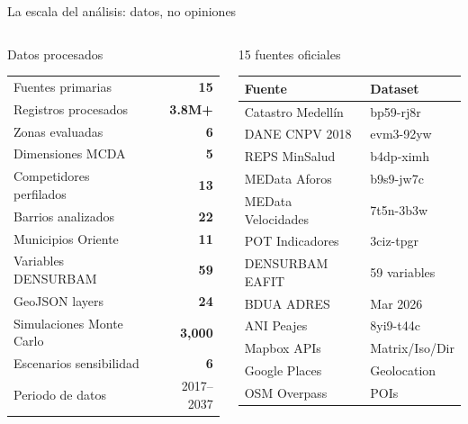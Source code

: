 \documentclass[aspectratio=169, 11pt]{beamer}
\newcommand{\src}[1]{\par\vspace{2pt}{\tiny\textcolor{slate}{Fuente: #1}}}
\begin{document}
\begin{frame}{La escala del análisis: datos, no opiniones}
\begin{columns}[T]
\begin{block}{\small Datos procesados}
\scriptsize
\begin{tabular}{@{}lr@{}}
\toprule
Fuentes primarias & \textbf{15} \\
Registros procesados & \textbf{3.8M+} \\
Zonas evaluadas & \textbf{6} \\
Dimensiones MCDA & \textbf{5} \\
Competidores perfilados & \textbf{13} \\
Barrios analizados & \textbf{22} \\
Municipios Oriente & \textbf{11} \\
Variables DENSURBAM & \textbf{59} \\
GeoJSON layers & \textbf{24} \\
Simulaciones Monte Carlo & \textbf{3,000} \\
Escenarios sensibilidad & \textbf{6} \\
Periodo de datos & 2017--2037 \\
\bottomrule
\end{tabular}
\end{block}

\begin{block}{\small 15 fuentes oficiales}
\scriptsize
\begin{tabular}{@{}ll@{}}
\toprule
\textbf{Fuente} & \textbf{Dataset} \\
\midrule
Catastro Medellín & bp59-rj8r \\
DANE CNPV 2018 & evm3-92yw \\
REPS MinSalud & b4dp-ximh \\
MEData Aforos & b9s9-jw7c \\
MEData Velocidades & 7t5n-3b3w \\
POT Indicadores & 3ciz-tpgr \\
DENSURBAM EAFIT & 59 variables \\
BDUA ADRES & Mar 2026 \\
ANI Peajes & 8yi9-t44c \\
Mapbox APIs & Matrix/Iso/Dir \\
Google Places & Geolocation \\
OSM Overpass & POIs \\
\bottomrule
\end{tabular}
\end{block}
\end{columns}
\src{Todos los datasets verificados y auditables. Dashboard: hptu-localizacion.vercel.app}
\end{frame}
\end{document}
